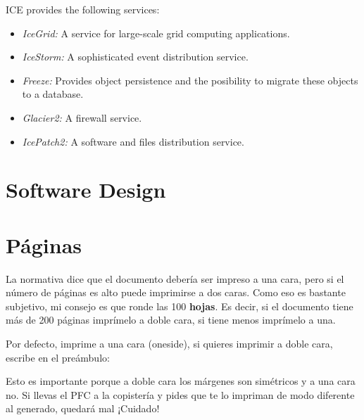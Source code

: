 ICE provides the following services:
\begin{itemize}
\item \emph{IceGrid:} A service for large-scale grid computing applications. 
\item \emph{IceStorm:} A sophisticated event distribution service.
\item \emph{Freeze:} Provides object persistence and the posibility to migrate
  these objects to a database.
\item \emph{Glacier2:} A firewall service.
\item \emph{IcePatch2:} A software and files distribution service.
\end{itemize} 

\section{Software Design}




\section{Páginas}
\label{sec:paginas}

La normativa dice que el documento debería ser impreso a una cara, pero si el
número de páginas es alto puede imprimirse a dos caras. Como eso es bastante
subjetivo, mi consejo es que ronde las 100 \textbf{hojas}. Es decir, si el
documento tiene más de 200 páginas imprímelo a doble cara, si tiene menos
imprímelo a una.

Por defecto, \arcopfc{} imprime a una cara (oneside), si quieres imprimir a doble cara,
escribe en el preámbulo:


Esto es importante porque a doble cara los márgenes son simétricos y a una cara
no. Si llevas el PFC a la copistería y pides que te lo impriman de modo
diferente al generado, quedará mal ¡Cuidado!
